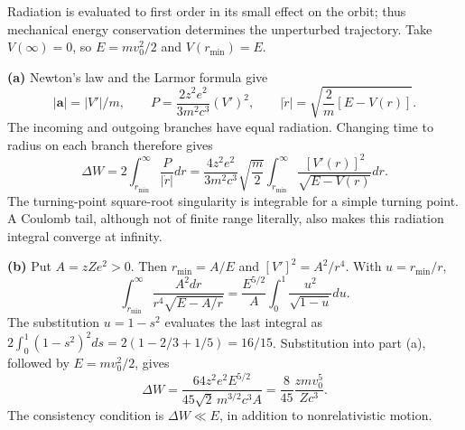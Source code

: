 Radiation is evaluated to first order in its small effect on the orbit;
thus mechanical energy conservation determines the unperturbed trajectory.
Take $V(\infty)=0$, so $E=mv_0^2/2$ and $V(r_{\min})=E$.

\textbf{(a)} Newton's law and the Larmor formula give
\[
|\mathbf a|=|V'|/m,\qquad
P=\frac{2z^2e^2}{3m^2c^3}(V')^2,\qquad
|\dot r|=\sqrt{\frac2m[E-V(r)]}.
\]
The incoming and outgoing branches have equal radiation. Changing time
to radius on each branch therefore gives
\[
\boxed{\Delta W=2\int_{r_{\min}}^\infty\frac P{|\dot r|}dr
=\frac{4z^2e^2}{3m^2c^3}\sqrt{\frac m2}
\int_{r_{\min}}^\infty\frac{[V'(r)]^2}{\sqrt{E-V(r)}}dr.}
\]
The turning-point square-root singularity is integrable for a simple
turning point. A Coulomb tail, although not of finite range literally,
also makes this radiation integral converge at infinity.

\textbf{(b)} Put $A=zZe^2>0$. Then $r_{\min}=A/E$ and
$[V']^2=A^2/r^4$. With $u=r_{\min}/r$,
\[
\int_{r_{\min}}^\infty\frac{A^2dr}{r^4\sqrt{E-A/r}}
=\frac{E^{5/2}}A\int_0^1\frac{u^2}{\sqrt{1-u}}du.
\]
The substitution $u=1-s^2$ evaluates the last integral as
$2\int_0^1(1-s^2)^2ds=2(1-2/3+1/5)=16/15$.
Substitution into part (a), followed by $E=mv_0^2/2$, gives
\[
\Delta W=\frac{64z^2e^2E^{5/2}}{45\sqrt2\,m^{3/2}c^3A}
=\boxed{\frac8{45}\frac{zmv_0^5}{Zc^3}}.
\]
The consistency condition is $\Delta W\ll E$, in addition to
nonrelativistic motion.

